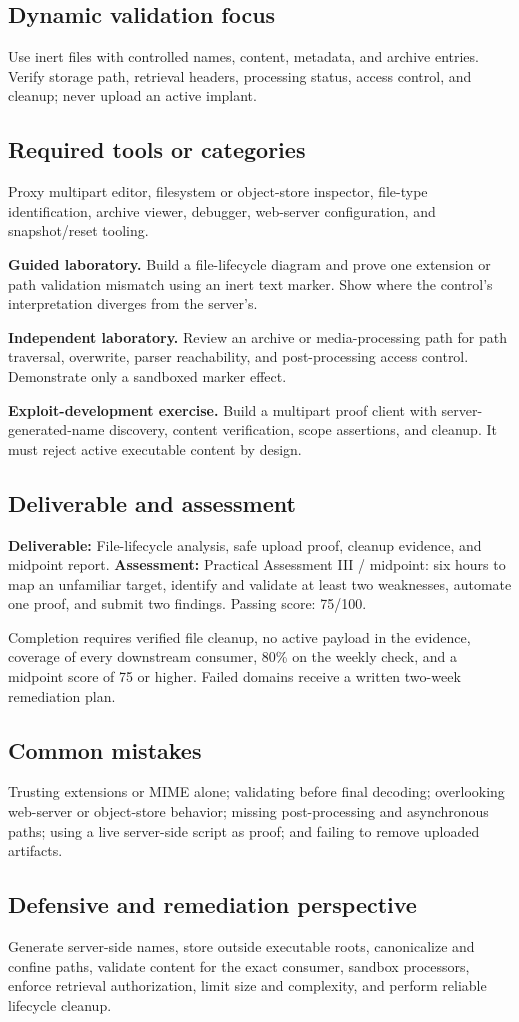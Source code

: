 \documentclass[11pt]{article}
\newcommand{\weekfield}[2]{%
  \Needspace{5\baselineskip}
  \subsection*{#1}
  #2
}
\newcommand{\deliverable}[1]{\textbf{Deliverable:} #1}
\newcommand{\assessment}[1]{\textbf{Assessment:} #1}
\begin{document}
\weekfield{Dynamic validation focus}{Use inert files with controlled names,
content, metadata, and archive entries. Verify storage path, retrieval headers,
processing status, access control, and cleanup; never upload an active implant.}

\weekfield{Required tools or categories}{Proxy multipart editor, filesystem or
object-store inspector, file-type identification, archive viewer, debugger,
web-server configuration, and snapshot/reset tooling.}

\begin{labbox}
\textbf{Guided laboratory.} Build a file-lifecycle diagram and prove one extension
or path validation mismatch using an inert text marker. Show where the control's
interpretation diverges from the server's.

\textbf{Independent laboratory.} Review an archive or media-processing path for
path traversal, overwrite, parser reachability, and post-processing access
control. Demonstrate only a sandboxed marker effect.

\textbf{Exploit-development exercise.} Build a multipart proof client with
server-generated-name discovery, content verification, scope assertions, and
cleanup. It must reject active executable content by design.
\end{labbox}

\weekfield{Deliverable and assessment}{\deliverable{File-lifecycle analysis,
safe upload proof, cleanup evidence, and midpoint report.}
\assessment{Practical Assessment III / midpoint: six hours to map an unfamiliar
target, identify and validate at least two weaknesses, automate one proof, and
submit two findings. Passing score: 75/100.}}

\begin{checkpoints}
Completion requires verified file cleanup, no active payload in the evidence,
coverage of every downstream consumer, 80\% on the weekly check, and a midpoint
score of 75 or higher. Failed domains receive a written two-week remediation plan.
\end{checkpoints}

\weekfield{Common mistakes}{Trusting extensions or MIME alone; validating before
final decoding; overlooking web-server or object-store behavior; missing
post-processing and asynchronous paths; using a live server-side script as proof;
and failing to remove uploaded artifacts.}

\weekfield{Defensive and remediation perspective}{Generate server-side names,
store outside executable roots, canonicalize and confine paths, validate content
for the exact consumer, sandbox processors, enforce retrieval authorization,
limit size and complexity, and perform reliable lifecycle cleanup.}
\end{document}
